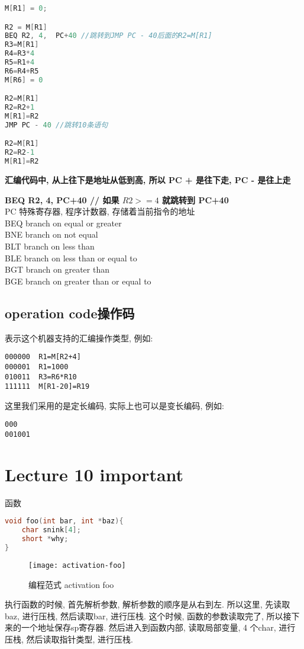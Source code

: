\documentclass{article}
\begin{document}
\begin{lstlisting}[language = C]
M[R1] = 0;

R2 = M[R1]
BEQ R2, 4,  PC+40 //跳转到JMP PC - 40后面的R2=M[R1]
R3=M[R1]
R4=R3*4
R5=R1+4
R6=R4+R5
M[R6] = 0

R2=M[R1]
R2=R2+1
M[R1]=R2
JMP PC - 40 //跳转10条语句

R2=M[R1]
R2=R2-1
M[R1]=R2
\end{lstlisting}
\textbf{汇编代码中, 从上往下是地址从低到高, 所以 PC + 是往下走, PC - 是往上走}

\bigskip\noindent
\textbf{BEQ R2, 4,  PC+40  // 如果 $R2 >=4$ 就跳转到 PC+40}\\
PC 特殊寄存器, 程序计数器, 存储着当前指令的地址\\
BEQ  branch on equal or greater\\
BNE branch on not equal\\
BLT branch on less than\\
BLE branch on less than or equal to\\
BGT branch on greater than\\
BGE branch on greater than or equal to\\

\subsection{operation code操作码}
表示这个机器支持的汇编操作类型,
例如:
\begin{verbatim}
000000	R1=M[R2+4]
000001	R1=1000
010011	R3=R6*R10
111111	M[R1-20]=R19
\end{verbatim}
这里我们采用的是定长编码,
实际上也可以是变长编码,
例如:
\begin{verbatim}
000
001001
\end{verbatim}

\section{Lecture 10 important}
函数
\begin{lstlisting}[language = C]
void foo(int bar, int *baz){
	char snink[4];
	short *why;
}
\end{lstlisting}
\begin{figure}[htbp]
	\centering
	\texttt{[image: activation-foo]}\\
	\caption{编程范式 activation foo}\label{fig.activation.foo}
\end{figure}

执行函数的时候, 首先解析参数, 解析参数的顺序是从右到左.
所以这里, 先读取baz, 进行压栈, 然后读取bar, 进行压栈.
这个时候, 函数的参数读取完了, 所以接下来的一个地址保存sp寄存器.
然后进入到函数内部, 读取局部变量, 4 个char, 进行压栈, 然后读取指针类型, 进行压栈.
\end{document}
